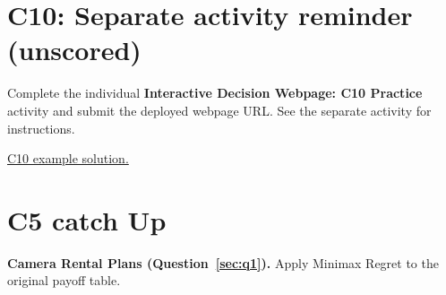 \section*{C10: Separate activity reminder (unscored)}
Complete the individual \textbf{Interactive Decision Webpage: C10 Practice} activity and submit the deployed webpage URL. See the separate activity for instructions.

\href{https://nolopez338.github.io/global_economics/grade10/src/pages/term1/g10-t1-c10dashboard.html}{C10 example solution.}

\section*{C5 catch Up}
{\small
\noindent\textbf{Camera Rental Plans (Question~\ref{sec:q1}).}
Apply Minimax Regret to the original payoff table.

}
